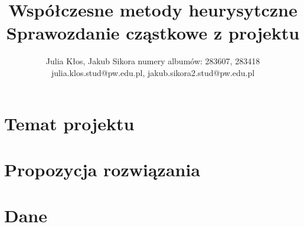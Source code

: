 \documentclass{article}
\title{Współczesne metody heurysytczne\\ Sprawozdanie cząstkowe z projektu}
\author{
Julia Kłos, Jakub Sikora
\affiliations
numery albumów: 283607, 283418 \\
\emails
julia.klos.stud@pw.edu.pl, jakub.sikora2.stud@pw.edu.pl
}
\begin{document}
\maketitle

\section{Temat projektu}
\label{sec:temat}

\section{Propozycja rozwiązania}
\label{sec:rozwiazanie}

\section{Dane}
\label{sec:dane}
\end{document}
